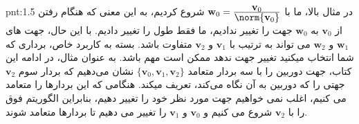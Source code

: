 {\begin{spacing}{1.5}
        \begin{point}{pnt:1.5}
            \Large
            در مثال بالا، ما با $\textbf{w}_{0}=\frac{\displaystyle\textbf{v}_{0}}{\displaystyle\norm{\textbf{v}_{0}}}$ شروع کردیم، به این معنی که هنگام رفتن از $\textbf{v}_{0}$ به $\textbf{w}_{0}$ جهت را تغییر ندادیم،
            ما فقط طول را تغییر دادیم.
            با این حال، جهت های $\textbf{w}_{1}$ و $\textbf{w}_{2}$ می تواند به ترتیب با $\textbf{v}_{1}$ و $\textbf{v}_{2}$ متفاوت باشد.
            بسته به کاربرد خاص، برداری که شما انتخاب میکنید تغییر جهت ندهد ممکن است مهم باشد.
            به عنوان مثال، در ادامه این کتاب، جهت دوربین را با سه بردار متعامد $\{\textbf{v}_{0},\textbf{v}_{1},\textbf{v}_{2}\}$ نشان می‌دهیم که بردار سوم $\textbf{v}_{2}$ جهتی را که دوربین به آن نگاه می‌کند، تعریف میکند.
            هنگامی که این بردارها را متعامد می کنیم، اغلب نمی خواهیم جهت مورد نظر خود را تغییر دهیم،
            بنابراین الگوریتم فوق را با $\textbf{v}_{2}$ شروع می کنیم و $\textbf{v}_{0}$ و $\textbf{v}_{1}$ را تغییر می دهیم تا بردارها متعامد شوند.
        \end{point}
    \end{spacing}
}


